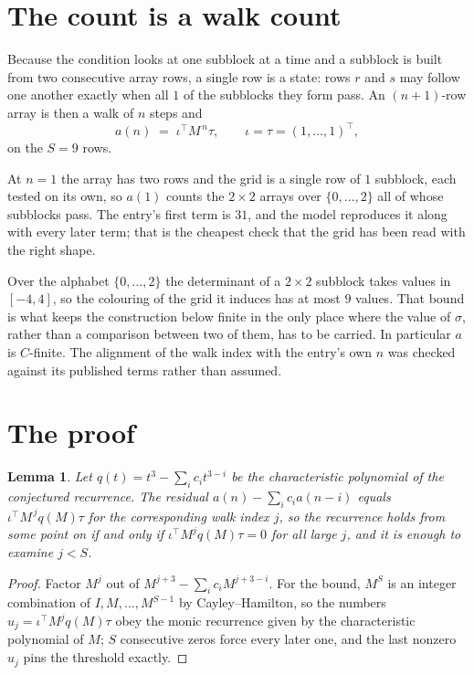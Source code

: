 \documentclass[11pt,a4paper]{article}
\theoremstyle{plain}
\newtheorem{lemma}[theorem]{Lemma}
\theoremstyle{definition}
\begin{document}
\section{The count is a walk count}

Because the condition looks at one subblock at a time and a subblock is
built from two consecutive array rows, a single row is a state: rows $r$ and $s$ may follow one
another exactly when all $1$ of the subblocks they form pass. An $(n+1)$-row array is then a
walk of $n$ steps and
\[
a(n)\;=\;\iota^{\!\top}M^{\,n}\tau,\qquad\iota=\tau=(1,\dots,1)^{\!\top},
\]
on the $S=9$ rows.

At $n=1$ the array has two rows and the grid is a single row of $1$
subblock, each tested on its own, so $a(1)$ counts the
$2\times2$ arrays over $\{0,\dots,2\}$ all of whose subblocks pass. The entry's
first term is $31$, and the model reproduces it along with every later term; that is the
cheapest check that the grid has been read with the right shape.

Over the alphabet $\{0,\dots,2\}$ the determinant of a $2\times2$ subblock takes values in
$[-4,4]$, so the colouring of the grid it induces has at most $9$ values.
That bound is what keeps the construction below finite in the only place where the value of
$\sigma$, rather than a comparison between two of them, has to be carried.
In particular $a$ is $C$-finite. The alignment of the walk index with the entry's own $n$ was
checked against its published terms rather than assumed.

\section{The proof}

\begin{lemma}\label{lem:crit}
Let $q(t)=t^{3}-\sum_i c_it^{3-i}$ be the characteristic polynomial of the
conjectured recurrence. The residual $a(n)-\sum_ic_ia(n-i)$ equals
$\iota^{\!\top}M^{\,j}q(M)\tau$ for the corresponding walk index $j$, so the recurrence
holds from some point on if and only if $\iota^{\!\top}M^{j}q(M)\tau=0$ for all large $j$,
and it is enough to examine $j<S$.
\end{lemma}

\begin{proof}
Factor $M^{j}$ out of $M^{j+3}-\sum_ic_iM^{j+3-i}$. For the bound, $M^{S}$
is an integer combination of $I,M,\dots,M^{S-1}$ by Cayley--Hamilton, so the numbers
$u_j=\iota^{\!\top}M^{j}q(M)\tau$ obey the monic recurrence given by the characteristic
polynomial of $M$; $S$ consecutive zeros force every later one, and the last nonzero $u_j$
pins the threshold exactly.
\end{proof}
\end{document}
